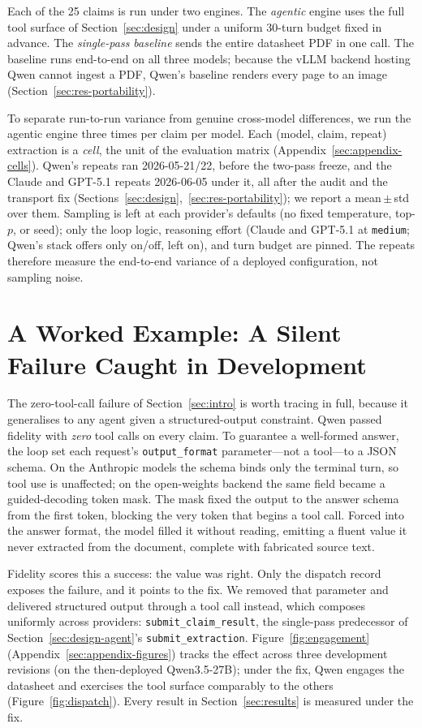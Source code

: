 \documentclass[11pt]{article}
\begin{document}
Each of the 25 claims is run under two engines. The \emph{agentic}
engine uses the full tool surface of Section~\ref{sec:design} under a
uniform 30-turn budget fixed in advance. The \emph{single-pass baseline}
sends the entire datasheet PDF in one call. The baseline runs end-to-end
on all three models; because the vLLM backend hosting Qwen cannot ingest
a PDF, Qwen's baseline renders every page to an image
(Section~\ref{sec:res-portability}).

To separate run-to-run variance from genuine cross-model differences, we
run the agentic engine three times per claim per model. Each (model,
claim, repeat) extraction is a \emph{cell}, the unit of the evaluation
matrix (Appendix~\ref{sec:appendix-cells}). Qwen's repeats ran
2026-05-21/22, before the two-pass freeze, and the Claude and GPT-5.1
repeats 2026-06-05 under it, all after the audit and
the transport fix
(Sections~\ref{sec:design},~\ref{sec:res-portability}); we report a
mean\,$\pm$\,std over them. Sampling is left at each provider's defaults
(no fixed temperature, top-$p$, or seed); only the loop logic, reasoning
effort (Claude and GPT-5.1 at \texttt{medium}; Qwen's stack offers only
on/off, left on), and turn budget are pinned. The repeats therefore
measure the end-to-end variance of a deployed configuration, not
sampling noise.

\section{A Worked Example: A Silent Failure Caught in Development}
\label{sec:worked-example}

The zero-tool-call failure of Section~\ref{sec:intro} is worth tracing
in full, because it generalises to any agent given a structured-output
constraint. Qwen passed fidelity with \emph{zero} tool calls on every
claim. To guarantee a well-formed answer, the loop set each request's
\texttt{output\_format} parameter---not a tool---to a JSON schema. On
the Anthropic models the schema binds only the terminal turn, so tool
use is unaffected; on the open-weights backend the same field became a
guided-decoding token mask. The mask fixed the output to the answer
schema from the first token, blocking the very token that begins a tool
call. Forced into the answer format, the model filled it without
reading, emitting a fluent value it never extracted from the document,
complete with fabricated source text.

Fidelity scores this a success: the value was right. Only the dispatch
record exposes the failure, and it points to the fix. We removed that
parameter and delivered structured output through a tool call instead,
which composes uniformly across providers:
\texttt{submit\_claim\_result}, the single-pass predecessor of
Section~\ref{sec:design-agent}'s \texttt{submit\_extraction}.
Figure~\ref{fig:engagement} (Appendix~\ref{sec:appendix-figures}) tracks
the effect across three development revisions (on the then-deployed
Qwen3.5-27B); under the fix, Qwen engages the datasheet and exercises
the tool surface comparably to the others (Figure~\ref{fig:dispatch}).
Every result in Section~\ref{sec:results} is measured under the fix.
\end{document}
